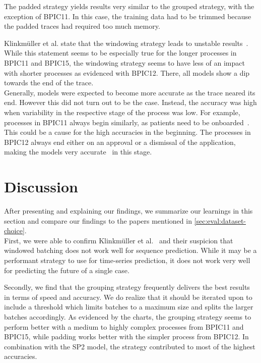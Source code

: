 The padded strategy yields results very similar to the grouped strategy, with the exception of BPIC11. In this case, the training data had to be trimmed because the padded traces had required too much memory.

Klinkmüller et al. state that the windowing strategy leads to unstable results~\cite{klinkmuller2018reliablemonitoring}. While this statement seems to be especially true for the longer processes in BPIC11 and BPIC15, the windowing strategy seems to have less of an impact with shorter processes as evidenced with BPIC12. There, all models show a dip towards the end of the trace.\\

Generally, models were expected to become more accurate as the trace neared its end. However this did not turn out to be the case. Instead, the accuracy was high when variability in the respective stage of the process was low. For example, processes in BPIC11 always begin similarly, as patients need to be onboarded~\cite{bose2011analysis}. This could be a cause for the high accuracies in the beginning. The processes in BPIC12 always end either on an approval or a dismissal of the application, making the models very accurate~\cite{adriansyah2012mining} in this stage.

\section{Discussion}\label{sec:eval:discussion}
After presenting and explaining our findings, we summarize our learnings in this section and compare our findings to the papers mentioned in \autoref{sec:eval:dataset-choice}.\\

First, we were able to confirm Klinkmüller et al.~\cite{klinkmuller2018reliablemonitoring} and their suspicion that windowed batching does not work well for sequence prediction. While it may be a performant strategy to use for time-series prediction, it does not work very well for predicting the future of a single case.

Secondly, we find that the grouping strategy frequently delivers the best results in terms of speed and accuracy. We do realize that it should be iterated upon to include a threshold which limits batches to a maximum size and splits the larger batches accordingly. As evidenced by the charts, the grouping strategy seems to perform better with a medium to highly complex processes from BPIC11 and BPIC15, while padding works better with the simpler process from BPIC12. In combination with the SP2 model, the strategy contributed to most of the highest accuracies.

